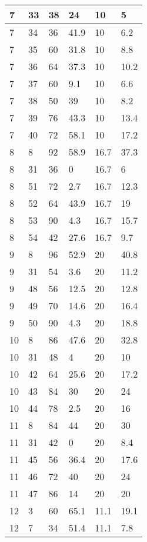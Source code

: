\begin{longtable}[c]{ | p{2cm} | p{2cm} | p{2cm} | p{2cm} | p{3cm} | p{3cm} | }
	\hline
	7 & 33 & 38 & 24 & 10 & 5 \\
	\hline
	7 & 34 & 36 & 41.9 & 10 & 6.2 \\
	\hline
	7 & 35 & 60 & 31.8 & 10 & 8.8 \\
	\hline
	7 & 36 & 64 & 37.3 & 10 & 10.2 \\
	\hline
	7 & 37 & 60 & 9.1 & 10 & 6.6 \\
	\hline
	7 & 38 & 50 & 39 & 10 & 8.2 \\
	\hline
	7 & 39 & 76 & 43.3 & 10 & 13.4 \\
	\hline
	7 & 40 & 72 & 58.1 & 10 & 17.2 \\
	\hline
	\hline
	\hline
	8 & 8 & 92 & 58.9 & 16.7 & 37.3 \\
	\hline
	8 & 31 & 36 & 0 & 16.7 & 6 \\
	\hline
	8 & 51 & 72 & 2.7 & 16.7 & 12.3 \\
	\hline
	8 & 52 & 64 & 43.9 & 16.7 & 19 \\
	\hline
	8 & 53 & 90 & 4.3 & 16.7 & 15.7 \\
	\hline
	8 & 54 & 42 & 27.6 & 16.7 & 9.7 \\
	\hline
	\hline
	\hline
	9 & 8 & 96 & 52.9 & 20 & 40.8 \\
	\hline
	9 & 31 & 54 & 3.6 & 20 & 11.2 \\
	\hline
	9 & 48 & 56 & 12.5 & 20 & 12.8 \\
	\hline
	9 & 49 & 70 & 14.6 & 20 & 16.4 \\
	\hline
	9 & 50 & 90 & 4.3 & 20 & 18.8 \\
	\hline
	\hline
	\hline
	10 & 8 & 86 & 47.6 & 20 & 32.8 \\
	\hline
	10 & 31 & 48 & 4 & 20 & 10 \\
	\hline
	10 & 42 & 64 & 25.6 & 20 & 17.2 \\
	\hline
	10 & 43 & 84 & 30 & 20 & 24 \\
	\hline
	10 & 44 & 78 & 2.5 & 20 & 16 \\
	\hline
	\hline
	\hline
	11 & 8 & 84 & 44 & 20 & 30 \\
	\hline
	11 & 31 & 42 & 0 & 20 & 8.4 \\
	\hline
	11 & 45 & 56 & 36.4 & 20 & 17.6 \\
	\hline
	11 & 46 & 72 & 40 & 20 & 24 \\
	\hline
	11 & 47 & 86 & 14 & 20 & 20 \\
	\hline
	\hline
	\hline
	12 & 3 & 60 & 65.1 & 11.1 & 19.1 \\
	\hline
	12 & 7 & 34 & 51.4 & 11.1 & 7.8 \\

\end{longtable}
